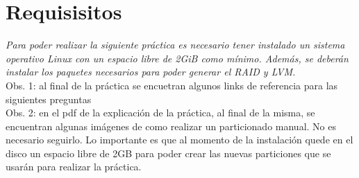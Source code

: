 \section{Requisisitos}
\textit{Para poder realizar la siguiente práctica es necesario tener instalado un sistema operativo Linux con un 
espacio libre de 2GiB como mínimo. Además, se deberán instalar los paquetes necesarios para poder generar el RAID 
y LVM.}\\
Obs. 1: al final de la práctica se encuetran algunos links de referencia para las siguientes preguntas\\
Obs. 2: en el pdf de la explicación de la práctica, al final de la misma, se encuentran algunas imágenes de como
realizar un particionado manual. No es necesario seguirlo. Lo importante es que al momento de la instalación quede
en el disco un espacio libre de 2GB para poder crear las nuevas particiones que se usarán para realizar la
práctica.

